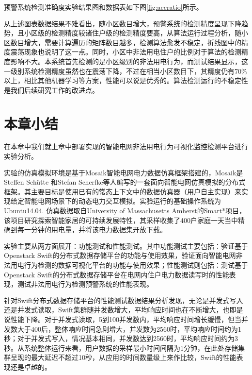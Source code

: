 预警系统检测准确度实验结果图和数据表如下图\ref{fig:accratio}所示。

\begin{figure}[!htp]
  \centering
  \hspace{1in}
\end{figure}

从上述图表数据结果不难看出，随小区数目增大，预警系统的检测精度呈现下降趋势，且小区级的检测精度较诸住户级的检测精度要高，从算法运行过程分析，随小区数目增大，需要计算遍历的矩阵数目越多，检测算法愈发不稳定，折线图中的精度震荡现象也说明了这一点。同时，小区中非法用电住户的比例对于算法的检测精度影响不大。本系统首先检测的是小区级别的非法用电行为，而测试结果显示，这一级别系统检测精度虽然也在震荡下降，不过在相当小区数目下，其精度仍有70\%以上，相比其他机器学习等方案，性能可以说是优秀的。算法检测运行的不稳定性是我们后续研究工作的改进点。

\section{本章小结}

在本章中我们就上章中部署实现的智能电网非法用电行为可视化监控检测平台进行实验分析。

实验的仿真模拟环境是基于Mosaik智能电网电力数据仿真框架搭建的，Mosaik是Steffen Schütte 和Stefan Scherfke等人编写的一套面向智能电网仿真模拟的分布式框架。其主要目标是使用已有的常态上下文中的数据仿真器（用户自主实现）来实现给定智能电网场景下的动态电力交互模拟。实验运行的基础操作系统为Ubuntu14.04. 仿真数据取自University of Massachusetts Amherst的Smart*项目，该项目研究探索智能家居的可持续发展特性，其采样收集了400户家庭一天当中精确到每一分钟的用电量，并将该电力数据集开放下载。

实验主要从两方面展开：功能测试和性能测试。其中功能测试主要包括：验证基于Openstack Swift的分布式数据存储平台的功能与使用效果，验证面向智能电网非法用电行为检测的数据可视化平台的功能与使用效果；性能测试则包括：测试基于Openstack Swift的分布式数据存储平台在电网内住户电力数据读写时的性能表现，测试非法用电行为检测预警系统的性能表现。

针对Swift分布式数据存储平台的性能测试数据结果分析发现，无论是并发式写入还是并发式读取，Swift集群随并发数增大，平均响应时间也在不断增大，也即是说性能下降。对于并发式读取，5到100并发数内，平均响应时间增长缓慢，但当并发数大于400后，整体响应时间急剧增大，并发数为2560时，平均响应时间约为1秒；对于并发式写入，情况基本相同，并发数达到2560时，平均响应时间约为3秒。从系统整体运行来看，用户数据的采样最小时间间隔为1分钟，在此处存储集群呈现的最大延迟不超过10秒，从应用的时间数量级上来作比较，Swift的性能表现还是卓越的。

